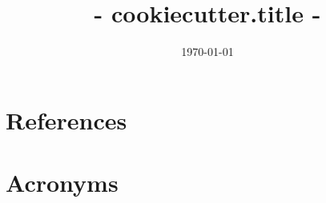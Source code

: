 \documentclass[modern]{aastex62}
\title{ {{- cookiecutter.title -}} }
\begin{document}

\date{\today}

\maketitle


\appendix
\section{References} \label{sec:bib}


\section{Acronyms} \label{sec:acronyms}

\end{document}
